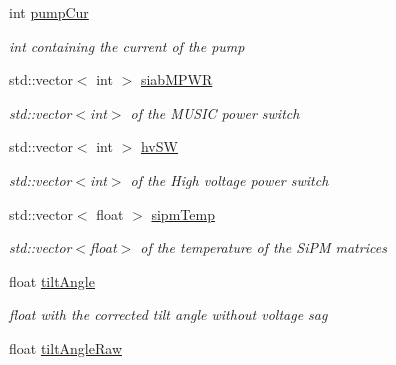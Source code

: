\begin{DoxyCompactItemize}
\mbox{\label{classIEvent_abb1473bb13d226a0a3534a901d5aa777}} 
int \hyperlink{classIEvent_abb1473bb13d226a0a3534a901d5aa777}{pump\+Cur}
\begin{DoxyCompactList}\small\item\em int containing the current of the pump \end{DoxyCompactList}\item 
\mbox{\label{classIEvent_a85729bba9cfb041b45c6fcef16fa826d}} 
std\+::vector$<$ int $>$ \hyperlink{classIEvent_a85729bba9cfb041b45c6fcef16fa826d}{siab\+M\+P\+WR}
\begin{DoxyCompactList}\small\item\em std\+::vector$<$int$>$ of the M\+U\+S\+IC power switch \end{DoxyCompactList}\item 
\mbox{\label{classIEvent_a5c3a4a98098fc4f76352565312969ae2}} 
std\+::vector$<$ int $>$ \hyperlink{classIEvent_a5c3a4a98098fc4f76352565312969ae2}{hv\+SW}
\begin{DoxyCompactList}\small\item\em std\+::vector$<$int$>$ of the High voltage power switch \end{DoxyCompactList}\item 
\mbox{\label{classIEvent_a7f2634e0595a1961538b9a9be3aaf4b9}} 
std\+::vector$<$ float $>$ \hyperlink{classIEvent_a7f2634e0595a1961538b9a9be3aaf4b9}{sipm\+Temp}
\begin{DoxyCompactList}\small\item\em std\+::vector$<$float$>$ of the temperature of the Si\+PM matrices \end{DoxyCompactList}\item 
\mbox{\label{classIEvent_a00ed8bd66889b65f7485895ec008940a}} 
float \hyperlink{classIEvent_a00ed8bd66889b65f7485895ec008940a}{tilt\+Angle}
\begin{DoxyCompactList}\small\item\em float with the corrected tilt angle without voltage sag \end{DoxyCompactList}\item 
\mbox{\label{classIEvent_a22570a7771466dac96c5285b758dd717}} 
float \hyperlink{classIEvent_a22570a7771466dac96c5285b758dd717}{tilt\+Angle\+Raw}

\end{DoxyCompactItemize}
